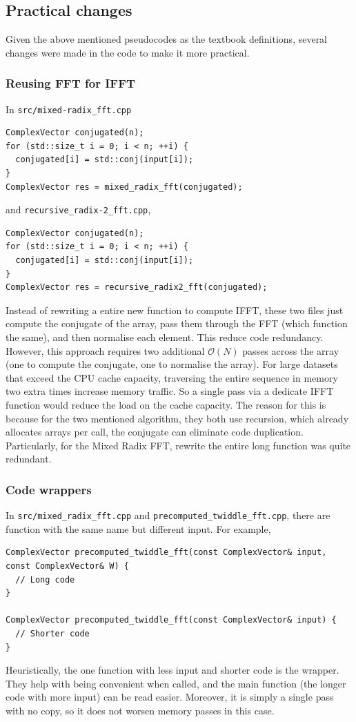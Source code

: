 \documentclass{article}
\begin{document}
\subsection{Practical changes}
Given the above mentioned pseudocodes as the textbook definitions, several changes were made in the code to make it more practical. 
\subsubsection{Reusing FFT for IFFT}
In \texttt{src/mixed-radix\_fft.cpp}
\begin{lstlisting}[style=latte-cpp]
ComplexVector conjugated(n);
for (std::size_t i = 0; i < n; ++i) {
  conjugated[i] = std::conj(input[i]);
}
ComplexVector res = mixed_radix_fft(conjugated);
\end{lstlisting}

and \texttt{recursive\_radix-2\_fft.cpp}, 
\begin{lstlisting}[style=latte-cpp]
ComplexVector conjugated(n);
for (std::size_t i = 0; i < n; ++i) {
  conjugated[i] = std::conj(input[i]);
}
ComplexVector res = recursive_radix2_fft(conjugated);
\end{lstlisting}
Instead of rewriting a entire new function to compute IFFT, these two files just compute the conjugate of the array, pass them through the FFT (which function the same), and then normalise each element. This reduce code redundancy. However, this approach requires two additional $\mathcal{O}(N)$ passes across the array (one to compute the conjugate, one to normalise the array). For large datasets that exceed the CPU cache capacity, traversing the entire sequence in memory two extra times increase memory traffic. So a single pass via a dedicate IFFT function would reduce the load on the cache capacity. The reason for this is because for the two mentioned algorithm, they both use recursion, which already allocates arrays per call, the conjugate can eliminate code duplication. Particularly, for the Mixed Radix FFT, rewrite the entire long function was quite redundant. 

\subsubsection{Code wrappers}
In \texttt{src/mixed\_radix\_fft.cpp} and \texttt{precomputed\_twiddle\_fft.cpp}, there are function with the same name but different input. For example, 
\begin{lstlisting}[style=latte-cpp]
ComplexVector precomputed_twiddle_fft(const ComplexVector& input, const ComplexVector& W) {
  // Long code 
} 

ComplexVector precomputed_twiddle_fft(const ComplexVector& input) {
  // Shorter code
}
\end{lstlisting}
Heuristically, the one function with less input and shorter code is the wrapper. They help with being convenient when called, and the main function (the longer code with more input) can be read easier. Moreover, it is simply a single pass with no copy, so it does not worsen memory passes in this case.
\end{document}
